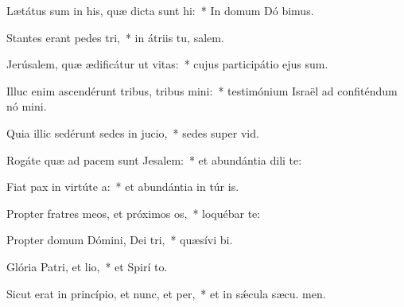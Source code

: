 \item Lætátus sum in his, quæ dicta sunt hi:~* In domum Dó bimus.
\item Stantes erant pedes tri,~* in átriis tu, salem.
\item Jerúsalem, quæ ædificátur ut vitas:~* cujus participátio ejus  sum.
\item Illuc enim ascendérunt tribus, tribus mini:~* testimónium Israël ad confiténdum nó mini.
\item Quia illic sedérunt sedes in jucio,~* sedes super  vid.
\item Rogáte quæ ad pacem sunt Jesalem:~* et abundántia dili te:
\item Fiat pax in virtúte a:~* et abundántia in túr is.
\item Propter fratres meos, et próximos os,~* loquébar   te:
\item Propter domum Dómini, Dei tri,~* quæsívi  bi.
\item Glória Patri, et lio,~* et Spirí to.
\item Sicut erat in princípio, et nunc, et per,~* et in sǽcula sæcu. men.
